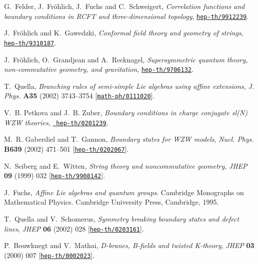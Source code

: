 \documentclass[12pt,a4paper]{article}
\begin{document}
\begin{thebibliography}{10}
G.~Felder, J.~{Fr\"ohlich}, J.~Fuchs and C.~Schweigert, {\it Correlation
  functions and boundary conditions in {RCFT} and three-dimensional topology},
  \href{http://arXiv.org/abs/hep-th/9912239}{{\tt hep-th/9912239}}.

J.~{Fr\"ohlich} and K.~Gawedzki, {\it Conformal field theory and geometry of
  strings},  \href{http://arXiv.org/abs/hep-th/9310187}{{\tt hep-th/9310187}}.

J.~{Fr\"ohlich}, O.~Grandjean and A.~Recknagel, {\it Supersymmetric quantum
  theory, non-commutative geometry, and gravitation},
  \href{http://arXiv.org/abs/hep-th/9706132}{{\tt hep-th/9706132}}.

T.~Quella, {\it Branching rules of semi-simple {Lie} algebras using affine
  extensions},  {\em J. Phys.} {\bf A35} (2002) 3743--3754
  [\href{http://arXiv.org/abs/math-ph/0111020}{{\tt math-ph/0111020}}].

V.~B. Petkova and J.~B. Zuber, {\it Boundary conditions in charge conjugate
  {sl(N)} {WZW} theories},  \href{http://arXiv.org/abs/hep-th/0201239}{{\tt
  hep-th/0201239}}.

M.~R. Gaberdiel and T.~Gannon, {\it Boundary states for {WZW} models},  {\em
  Nucl. Phys.} {\bf B639} (2002) 471--501
  [\href{http://arXiv.org/abs/hep-th/0202067}{{\tt hep-th/0202067}}].

N.~Seiberg and E.~Witten, {\it String theory and noncommutative geometry},
  {\em JHEP} {\bf 09} (1999) 032
  [\href{http://arXiv.org/abs/hep-th/9908142}{{\tt hep-th/9908142}}].

J.~Fuchs, {\em {Affine Lie algebras and quantum groups}}.
\newblock Cambridge Monographs on Mathematical Physics. Cambridge University
  Press, Cambridge, 1995.

T.~Quella and V.~Schomerus, {\it Symmetry breaking boundary states and defect
  lines},  {\em JHEP} {\bf 06} (2002) 028
  [\href{http://arXiv.org/abs/hep-th/0203161}{{\tt hep-th/0203161}}].

P.~Bouwknegt and V.~Mathai, {\it {D-branes}, {B-fields} and twisted
  {K-theory}},  {\em JHEP} {\bf 03} (2000) 007
  [\href{http://arXiv.org/abs/hep-th/0002023}{{\tt hep-th/0002023}}].


\end{thebibliography}
\end{document}

